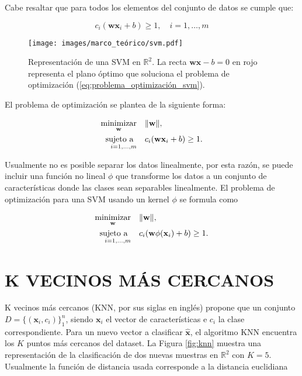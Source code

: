 Cabe resaltar que para todos los elementos del conjunto de datos se cumple que:

\begin{equation}
    c_i(\mathbf{w}\mathbf{x}_i + b) \geq 1, \quad i=1,\dots, m
\end{equation}

\begin{figure}[H]
    \centering
    \texttt{[image: images/marco\_teórico/svm.pdf]}
    \caption{\hspace{2mm}Representación de una SVM en $\mathbb{R}^2$. La recta $\mathbf{wx} -b = 0$ en rojo representa el plano óptimo que soluciona el problema de optimización (\ref{eq:problema_optimización_svm}).}
    \label{fig:svm}
\end{figure}

El problema de optimización se plantea de la siguiente forma:

\begin{equation}
    \begin{aligned}
        \operatorname*{minimizar}_{\mathbf{w}} & \quad \Vert \mathbf{w} \Vert, \\
        \operatorname*{sujeto \ a}_{\quad i=1,\dots, m} & \quad c_i(\mathbf{w}\mathbf{x}_i + b) \geq 1.
    \end{aligned}
    \label{eq:problema_optimización_svm}
\end{equation}

Usualmente no es posible separar los datos linealmente, por esta razón, se puede incluir una función no lineal $ \phi$ que transforme los datos a un conjunto de características donde las clases sean separables linealmente. El problema de optimización para una SVM usando un kernel $\phi$ se formula como

\begin{equation}
    \begin{aligned}
        \operatorname*{minimizar}_{\mathbf{w}} & \quad \Vert \mathbf{w} \Vert, \\
        \operatorname*{sujeto \ a}_{\quad i=1,\dots, m} & \quad c_i(\mathbf{w}\phi(\mathbf{x}_i) + b) \geq 1.
    \end{aligned}
\end{equation}


\section{K VECINOS MÁS CERCANOS}

K vecinos más cercanos (KNN, por sus siglas en inglés) propone que un conjunto $D = \{(\mathbf{x}_i, c_i)\}_1^n$, siendo $\mathbf{x}_i$ el vector de características e $c_i$ la clase correspondiente. Para un nuevo vector a clasificar $\mathbf{\hat{x}}$, el algoritmo KNN encuentra los $K$ puntos más cercanos del dataset. La Figura \ref{fig:knn} muestra una representación de la clasificación de dos nuevas muestras en $\mathbb{R}^2$ con $K = 5$. Usualmente la función de distancia usada corresponde a la distancia euclidiana

